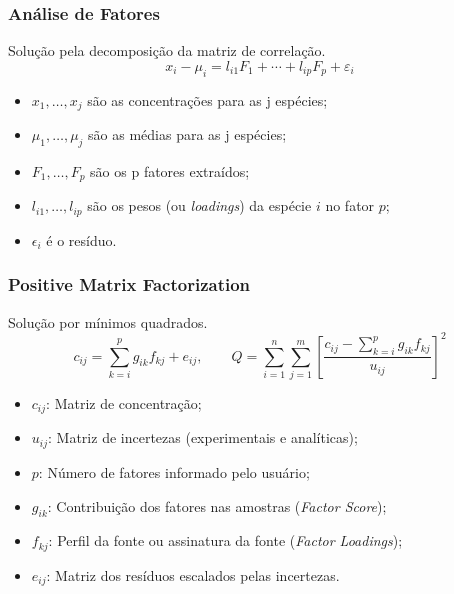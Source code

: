 \begin{frame}
  \frametitle{Análise de Fatores}
  Solução pela decomposição da matriz de correlação. 
\begin{equation*}
\label{eq:af}
x_i-\mu_i = l_{i1} F_1 + \cdots + l_{ip} F_p + \varepsilon_i 
\end{equation*}
  \begin{itemize}
  	\item $x_1,\dots,x_j$ são as concentrações para as j espécies;
    \item  $\mu_1,\dots,\mu_j$ são as médias para as j espécies;
    \item $F_1, \dots, F_p$ são os p fatores extraídos;
    \item $l_{i1}, \dots, l_{ip}$ são os pesos (ou \textit{loadings}) da espécie $i$ no fator $p$;
    \item $\epsilon_{i}$ é o resíduo.
   \end{itemize}
\end{frame}

\begin{frame}
	\frametitle{Positive Matrix Factorization}
Solução por mínimos quadrados. 
\begin{equation*}
c_{ij} = \sum_{k=i}^p g_{ik}f_{kj} + e_{ij},
\qquad
Q = \sum_{i=1}^n \sum_{j=1}^m  \left[ \frac{c_{ij} - \sum_{k=i}^p g_{ik}f_{kj}} {u_{ij}} \right] ^2
\end{equation*}


\begin{itemize}
		\item $c_{ij}$: Matriz de concentração;
		\item $u_{ij}$: Matriz de incertezas (experimentais e analíticas);
		\item $p$: Número de fatores informado pelo usuário;
		\item $g_{ik}$: Contribuição dos fatores nas amostras (\textit{Factor Score});
		\item $f_{kj}$: Perfil da fonte ou assinatura da fonte (\textit{Factor Loadings});
		\item $e_{ij}$: Matriz dos resíduos escalados pelas incertezas.

\end{itemize}
\end{frame}

